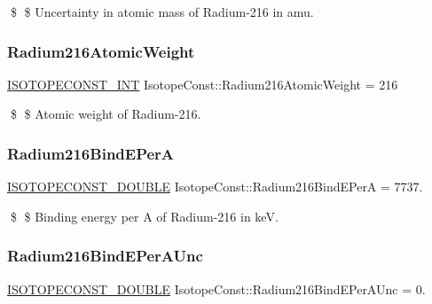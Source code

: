 \$ \$ Uncertainty in atomic mass of Radium-\/216 in amu. \mbox{\label{group___isotope_const-_radium-_ra216_ga31459abb99e86f4a835b7d36a9424cff}} 
\subsubsection{\texorpdfstring{Radium216\+Atomic\+Weight}{Radium216AtomicWeight}}
{\footnotesize\ttfamily \mbox{\hyperlink{group___isotope_const-_macros_ga5f18360b3e99483a35c32d789e62621c}{I\+S\+O\+T\+O\+P\+E\+C\+O\+N\+S\+T\+\_\+\+I\+NT}} Isotope\+Const\+::\+Radium216\+Atomic\+Weight = 216}

\$ \$ Atomic weight of Radium-\/216. \mbox{\label{group___isotope_const-_radium-_ra216_ga5ac595a0f039ce4a5fb41da1dbf74755}} 
\subsubsection{\texorpdfstring{Radium216\+Bind\+E\+PerA}{Radium216BindEPerA}}
{\footnotesize\ttfamily \mbox{\hyperlink{group___isotope_const-_macros_ga8f45a7272ce02c0b4c65c44636ed719a}{I\+S\+O\+T\+O\+P\+E\+C\+O\+N\+S\+T\+\_\+\+D\+O\+U\+B\+LE}} Isotope\+Const\+::\+Radium216\+Bind\+E\+PerA = 7737.}

\$ \$ Binding energy per A of Radium-\/216 in keV. \mbox{\label{group___isotope_const-_radium-_ra216_ga73d8b629ef23fc85c685a797df796364}} 
\subsubsection{\texorpdfstring{Radium216\+Bind\+E\+Per\+A\+Unc}{Radium216BindEPerAUnc}}
{\footnotesize\ttfamily \mbox{\hyperlink{group___isotope_const-_macros_ga8f45a7272ce02c0b4c65c44636ed719a}{I\+S\+O\+T\+O\+P\+E\+C\+O\+N\+S\+T\+\_\+\+D\+O\+U\+B\+LE}} Isotope\+Const\+::\+Radium216\+Bind\+E\+Per\+A\+Unc = 0.}


